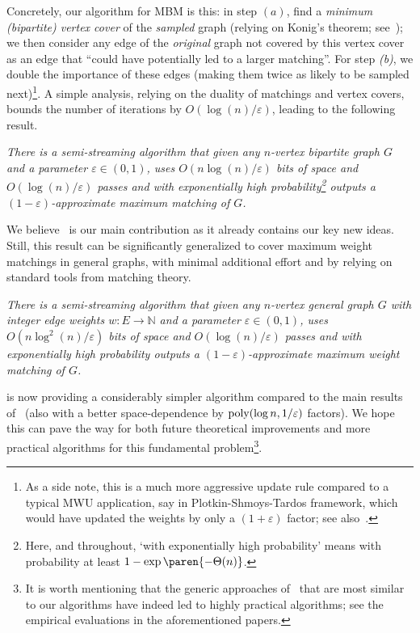 \documentclass{theoretics}
\DeclarePairedDelimiter{\paren}()
\newcommand{\eps}{\varepsilon}
\newcommand{\poly}{\mbox{\rm poly}}
\newcommand{\IN}{\mathbb{N}}
\begin{document}
Concretely, our algorithm for MBM is this: in step $(a)$, find 
a \emph{minimum (bipartite) vertex cover} of the \emph{sampled} graph (relying on Konig's theorem; see~); we then consider any edge of the \emph{original} graph not covered by this vertex cover
as an edge that ``could have potentially led to a larger matching''. For step \emph{(b)}, we double the importance of these edges (making
them twice as likely to be sampled next)\footnote{As a side note, this is a much more aggressive update rule compared to a typical MWU application, say in Plotkin-Shmoys-Tardos framework, which would have updated the weights
 by only a $(1 + \eps)$ factor; see also~.}. A simple analysis, relying on the duality of matchings and vertex covers,  bounds 
the number of iterations by $O(\log{\!(n)}/\eps)$, leading to the following result. 

\begin{result}\label{res:MBM}
\emph{There is a semi-streaming algorithm that given any $n$-vertex bipartite graph $G$ and a parameter $\eps \in (0,1)$, uses $O(n\log{\!(n)}/\eps)$ bits of space and $O(\log{\!(n)}/\eps)$ passes
	and with exponentially high probability\footnote{Here, and throughout, `with exponentially high probability' means with probability at least $1-\exp\paren{-\Theta(n)}$.} outputs a $(1-\eps)$-approximate maximum matching of $G$.} 
\end{result}

We believe~ is our main contribution as it already contains our key new ideas. Still, 
this result can be significantly generalized to cover maximum weight matchings in general graphs, with minimal additional effort and by relying on standard tools from matching theory. 

\begin{result}\label{res:MWM}
\emph{There is a semi-streaming algorithm that given any $n$-vertex general graph $G$ with integer edge weights $w: E \rightarrow \IN$ and a parameter $\eps \in (0,1)$, uses $O(n\log^2{\!(n)}/\eps)$ bits of space and $O(\log{\!(n)}/\eps)$ passes
	and with exponentially high probability outputs a $(1-\eps)$-approximate maximum weight matching of $G$.} 
\end{result}
 is now providing a considerably simpler algorithm compared to the main results of~\cite{AhnG15} (also with a better space-dependence by $\poly{(\log{n},1/\eps)}$ factors). We hope this can pave the way for both future theoretical improvements  
and more practical algorithms for this fundamental problem\footnote{It is worth mentioning that the generic approaches of~\cite{LattanziMSV11,KumarMVV13} that are most similar to our algorithms have 
indeed led to highly practical algorithms; see the empirical evaluations in the aforementioned papers.}. 
\end{document}
